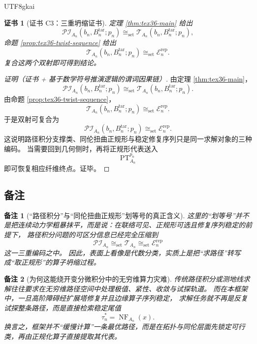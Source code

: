 \documentclass[12pt]{article}
\newtheorem{remark}{备注}[section]
\newtheorem{Certificate}{证书}[section]
\newcommand{\PT}{\operatorname{PT}}
\newcommand{\NF}{\operatorname{NF}}
\begin{document}
\begin{CJK*}{UTF8}{gkai}
\begin{Certificate}[证书 C3：三重坍缩证书]
\label{cert:tex36-c3}
定理 \ref{thm:tex36-main} 给出
\[
  \mathcal{PI}_{A_n}(b_n,B_n^{\mathrm{tar}};p_n)
  \cong_{\mathrm{set}}
  \mathcal{T}_{A_n}(b_n,B_n^{\mathrm{tar}};p_n),
\]
命题 \ref{prop:tex36-twist-sequence} 给出
\[
  \mathcal{T}_{A_n}(b_n,B_n^{\mathrm{tar}};p_n)
  \cong_{\mathrm{set}}
  \mathcal E_n^{\mathrm{rep}}.
\]
复合这两个双射即可得到结论。
\end{Certificate}

\begin{proof}[证明（证书 + 基于数学符号推演逻辑的谓词因果链）]
由定理 \ref{thm:tex36-main}，
\[
  \mathcal{PI}_{A_n}(b_n,B_n^{\mathrm{tar}};p_n)
  \cong_{\mathrm{set}}
  \mathcal{T}_{A_n}(b_n,B_n^{\mathrm{tar}};p_n).
\]
由命题 \ref{prop:tex36-twist-sequence}，
\[
  \mathcal{T}_{A_n}(b_n,B_n^{\mathrm{tar}};p_n)
  \cong_{\mathrm{set}}
  \mathcal E_n^{\mathrm{rep}}.
\]
于是双射可复合为
\[
  \mathcal{PI}_{A_n}(b_n,B_n^{\mathrm{tar}};p_n)
  \cong_{\mathrm{set}}
  \mathcal E_n^{\mathrm{rep}}.
\]
这说明路径积分支撑类、同伦扭曲正规形与稳定修复序列只是同一求解对象的三种编码。
当需要回到几何侧时，再将正规形代表送入
\[
  \PT_{A_n}^{p_n}
\]
即可恢复相应纤维终点。证毕。
\end{proof}

\subsection{备注}
\label{subsec:tex36-ch3-remarks}

\begin{remark}[“路径积分”与“同伦扭曲正规形”划等号的真正含义]
这里的“划等号”并不是把连续动力学粗暴抹平，而是说：在联络可见、正规形可选且修复序列稳定的前提下，
路径积分问题的可区分信息已经完全压缩到
\[
  \mathcal{PI}_{A_n}
  \cong_{\mathrm{set}}
  \mathcal{T}_{A_n}
  \cong_{\mathrm{set}}
  \mathcal E_n^{\mathrm{rep}}
\]
这一三重编码之中。
因此，表面上看像是代数分类，实质上是把“求路径”转写成“取正规形”的算子坍缩过程。
\end{remark}

\begin{remark}[为何这能绕开变分微积分中的无穷维算力灾难]
传统路径积分或测地线求解往往要求在无穷维路径空间中处理极值、紧性、收敛与试探轨道。
而在本框架中，一旦高阶障碍经扩展塔修复并且边缘算子序列稳定，
求解任务就不再是反复试探整条路径，而是直接检索稳定尾值
\[
  \tau_n^\ast=\NF_{A_n}(x).
\]
换言之，框架并不“缓慢计算”一条最优路径，而是在拓扑与同伦层面先锁定可行类，再由正规化算子直接提取其代表。
\end{remark}


\end{CJK*}
\end{document}
